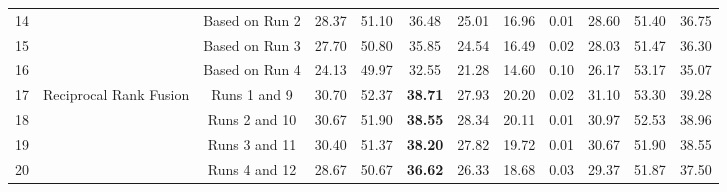 \begin{table}
\begin{tabular}{c|c|c|ccc|cc|c|ccc}
14 &  & Based on Run 2 & 28.37 & 51.10 & 36.48 & 25.01 & 16.96 & 0.01 & 28.60 & 51.40 & 36.75\tabularnewline
15 &  & Based on Run 3  & 27.70 & 50.80 & 35.85 & 24.54 & 16.49 & 0.02 & 28.03 & 51.47 & 36.30\tabularnewline
16 &  & Based on Run 4 & 24.13 & 49.97 & 32.55 & 21.28 & 14.60 & 0.10 & 26.17 & 53.17 & 35.07\tabularnewline
\midrule 
17 & \multirow{4}{*}{Reciprocal Rank Fusion} & Runs 1 and 9 & 30.70 & 52.37 & \textbf{38.71} & 27.93 & 20.20 & 0.02 & 31.10 & 53.30 & 39.28\tabularnewline
18 &  & Runs 2 and 10 & 30.67 & 51.90 & \textbf{38.55} & 28.34 & 20.11 & 0.01 & 30.97 & 52.53 & 38.96\tabularnewline
19 &  & Runs 3 and 11 & 30.40 & 51.37 & \textbf{38.20} & 27.82 & 19.72 & 0.01 & 30.67 & 51.90 & 38.55\tabularnewline
20 &  & Runs 4 and 12 & 28.67 & 50.67 & \textbf{36.62} & 26.33 & 18.68 & 0.03 & 29.37 & 51.87 & 37.50\tabularnewline
\bottomrule
\end{tabular}
\end{table}
